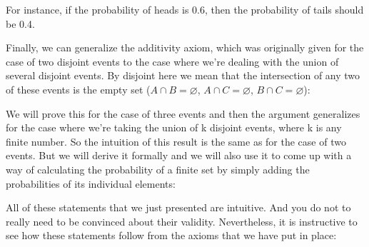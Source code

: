\documentclass[pdftex, brazil, 12pt, twoside]{article}
\begin{document}
For instance, if the probability of heads is 0.6,
then the probability of tails should be 0.4.

Finally, we can generalize the additivity axiom, which was
originally given for the case of two disjoint events to the
case where we're dealing with the union of
several disjoint events.
By disjoint here we mean that the intersection of any two of
these events is the empty set ($A \cap B = \varnothing$, $A \cap C
= \varnothing$, $B \cap C = \varnothing$):

\begin{figure}[H]
  \begin{center}
  \end{center}
\end{figure}

We will prove this for the case of three events and then
the argument generalizes for the case where we're taking
the union of k disjoint events, where k
is any finite number.
So the intuition of this result is the same as for the
case of two events.
But we will derive it formally and we will also use it to
come up with a way of calculating the probability of
a finite set by simply adding the probabilities of its
individual elements:

\begin{figure}[H]
  \begin{center}
  \end{center}
\end{figure}

All of these statements that we just
presented are intuitive.
And you do not to really need to be
convinced about their validity.
Nevertheless, it is instructive to see how these
statements follow from the axioms that
we have put in place:
\end{document}

